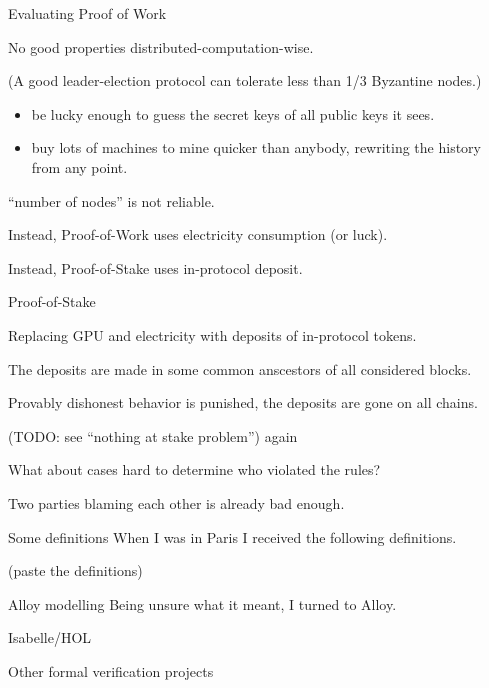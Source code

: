 \documentclass{beamer}
\begin{document}
\begin{frame}{Evaluating Proof of Work}

No good properties distributed-computation-wise.

(A good leader-election protocol can tolerate less than 1/3 Byzantine nodes.)

\begin{itemize}
\item be lucky enough to guess the secret keys of all public keys it sees.
\end{itemize}

\begin{itemize}
\item buy lots of machines to mine quicker than anybody, rewriting the history from any point.
\end{itemize}

 ``number of nodes'' is not reliable.

Instead, Proof-of-Work uses electricity consumption (or luck).

Instead, Proof-of-Stake uses in-protocol deposit.

\end{frame}


\begin{frame}{Proof-of-Stake}

Replacing GPU and electricity with deposits of in-protocol tokens.

The deposits are made in some common anscestors of all considered blocks.

Provably dishonest behavior is punished, the deposits are gone on all chains.

(TODO: see ``nothing at stake problem'') again

What about cases hard to determine who violated the rules?

Two parties blaming each other is already bad enough.
\end{frame}


\begin{frame}{Some definitions}
When I was in Paris I received the following definitions.

(paste the definitions)
\end{frame}

\begin{frame}{Alloy modelling}
Being unsure what it meant, I turned to Alloy.
\end{frame}


\begin{frame}{Isabelle/HOL}

\end{frame}


\begin{frame}{Other formal verification projects}
\end{frame}
\end{document}
